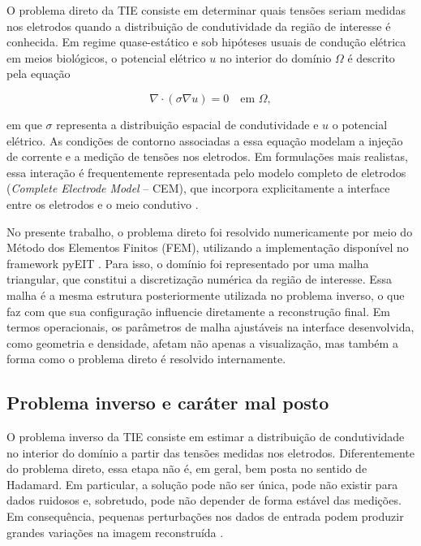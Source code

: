 O problema direto da TIE consiste em determinar quais tensões seriam medidas nos eletrodos quando a distribuição de condutividade da região de interesse é conhecida. Em regime quase-estático e sob hipóteses usuais de condução elétrica em meios biológicos, o potencial elétrico \(u\) no interior do domínio \(\Omega\) é descrito pela equação

\begin{equation}
\nabla \cdot (\sigma \nabla u) = 0 \quad \text{em } \Omega ,
\end{equation}

em que \(\sigma\) representa a distribuição espacial de condutividade e \(u\) o potencial elétrico. As condições de contorno associadas a essa equação modelam a injeção de corrente e a medição de tensões nos eletrodos. Em formulações mais realistas, essa interação é frequentemente representada pelo modelo completo de eletrodos (\textit{Complete Electrode Model} -- CEM), que incorpora explicitamente a interface entre os eletrodos e o meio condutivo \cite{Somersalo1992CEM}.

No presente trabalho, o problema direto foi resolvido numericamente por meio do Método dos Elementos Finitos (FEM), utilizando a implementação disponível no framework pyEIT \cite{pyEITReadme}. Para isso, o domínio foi representado por uma malha triangular, que constitui a discretização numérica da região de interesse. Essa malha é a mesma estrutura posteriormente utilizada no problema inverso, o que faz com que sua configuração influencie diretamente a reconstrução final. Em termos operacionais, os parâmetros de malha ajustáveis na interface desenvolvida, como geometria e densidade, afetam não apenas a visualização, mas também a forma como o problema direto é resolvido internamente.

\subsection{Problema inverso e caráter mal posto}
\label{subsec:problema_inverso}

O problema inverso da TIE consiste em estimar a distribuição de condutividade no interior do domínio a partir das tensões medidas nos eletrodos. Diferentemente do problema direto, essa etapa não é, em geral, bem posta no sentido de Hadamard. Em particular, a solução pode não ser única, pode não existir para dados ruidosos e, sobretudo, pode não depender de forma estável das medições. Em consequência, pequenas perturbações nos dados de entrada podem produzir grandes variações na imagem reconstruída \cite{Lionheart2003EITRA}.

